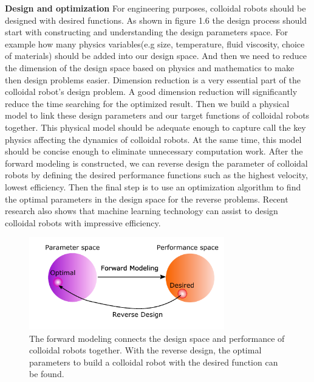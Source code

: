 \textbf{Design and optimization} For engineering purposes, colloidal robots should be designed with desired functions\autocite{liebchen2019optimal}. As shown in figure 1.6 the design process should start with constructing and understanding the design parameters space. For example how many physics variables(e.g size, temperature, fluid viscosity, choice of materials) should be added into our design space. And then we  need to reduce the dimension of the design space based on physics and mathematics to make then design problems easier. Dimension reduction is a very essential part of the colloidal robot's design problem. A good dimension reduction will significantly reduce the time searching for the optimized result. Then we build a physical model to link these design parameters and our target functions of colloidal robots together. This physical model should be adequate enough  to capture call the key physics affecting the dynamics of colloidal robots. At the same time, this model should be concise enough to eliminate unnecessary computation work. After the forward modeling is constructed, we can reverse design the parameter of colloidal robots by defining the desired performance functions such as the highest velocity, lowest efficiency. Then the final step is to use an optimization algorithm to find the optimal parameters in the design space for the reverse problems. \autocite{ward1963hierarchical,nocedal2006numerical} Recent research also shows that machine learning technology can assist to design colloidal robots with impressive efficiency\autocite{yang2020micro,yang2020cargo,yang2019deep,tsang2018self}.
\begin{figure}
\centering
\includegraphics[width=8.5cm]{figures/1_6.pdf}
\caption{The forward modeling connects the design space and performance of colloidal robots together. With the reverse design, the optimal parameters to build a colloidal robot with the desired function can be found.}
\label{fig:1.6}
\end{figure}


